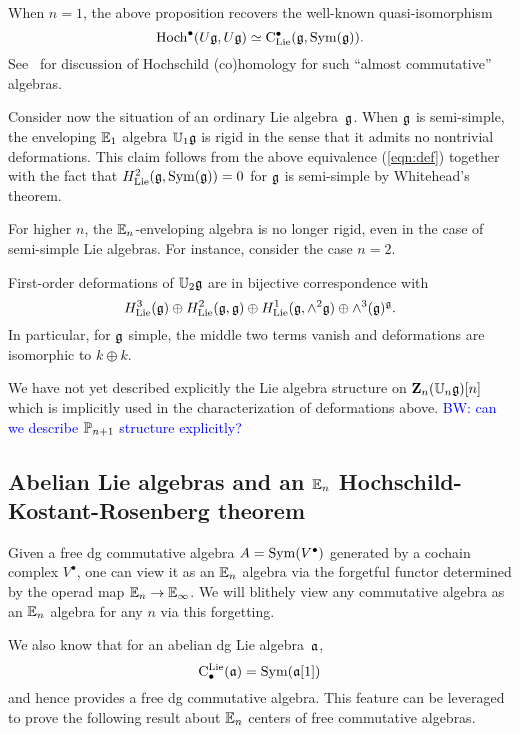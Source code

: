 \documentclass[11pt]{amsart}
\numberwithin{equation}{section}
\def\brian{\textcolor{blue}{BW: }\textcolor{blue}}
\begin{document}
When $n=1$, the above proposition recovers the well-known quasi-isomorphism
\[
{\rm Hoch}^\bullet(U \mathfrak g , U \mathfrak g) \simeq {\rm C}_{{\rm Lie}}^\bullet(\mathfrak g , {\rm Sym}(\mathfrak g)).
\]
See~\cite{LodayCyclicBook} for discussion of Hochschild (co)homology for such ``almost commutative'' algebras. 

Consider now the situation of an ordinary Lie algebra~$\mathfrak g$.
When $\mathfrak g$ is semi-simple, the enveloping $\mathbb E_1$ algebra $\mathbb U_1 \mathfrak g$ is rigid in the sense that it admits no nontrivial deformations. 
This claim follows from the above equivalence (\ref{eqn:def}) together with the fact that $H_{\rm Lie}^2(\mathfrak g , {\rm Sym}(\mathfrak g)) = 0$ for $\mathfrak g$ is semi-simple by Whitehead's theorem. 

For higher $n$, the $\mathbb E_n$-enveloping algebra is no longer rigid, even in the case of semi-simple Lie algebras. 
For instance, consider the case $n=2$.

\begin{cor}
First-order deformations of $\mathbb U_2 \mathfrak g$ are in bijective correspondence with
\[
H^3_{\rm Lie}(\mathfrak g) \oplus H^2_{\rm Lie}(\mathfrak g , \mathfrak g) \oplus H^1_{\rm Lie}(\mathfrak g , \wedge^2 \mathfrak g) \oplus \wedge^3(\mathfrak g)^\mathfrak g .
\]
In particular, for $\mathfrak g$ simple, the middle two terms vanish and deformations are isomorphic to $k \oplus k$.
\end{cor}

We have not yet described explicitly the Lie algebra structure on $\mathbf Z_n(\mathbb U_n \mathfrak g)[n]$ which is implicitly used in the characterization of deformations above. 
\brian{can we describe $\mathbb P_{n+1}$ structure explicitly?}

\subsection{Abelian Lie algebras and an $\mathbb E_n$ Hochschild-Kostant-Rosenberg theorem}

Given a free dg commutative algebra $A = {\rm Sym}(V^\bullet)$ generated by a cochain complex $V^\bullet$,
one can view it as an $\mathbb E_n$ algebra via the forgetful functor determined by the operad map $\mathbb E_n \to \mathbb E_\infty$.
We will blithely view any commutative algebra as an $\mathbb E_n$ algebra for any $n$ via this forgetting.

We also know that for an abelian dg Lie algebra~${\frak a}$, 
\[
{\rm C}^{\rm Lie}_\bullet({\frak a}) = {\rm Sym}({\frak a}[1])
\]
and hence provides a free dg commutative algebra.
This feature can be leveraged to prove the following result about $\mathbb E_n$ centers of free commutative algebras.
\end{document}

